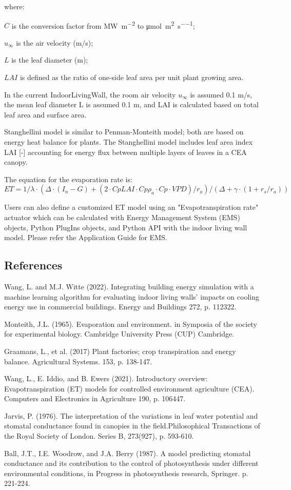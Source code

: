 where:

\(C\) is the conversion factor from \unit{\mega\watt\per\square\meter} to \unit{\micro\mole\per\square\meter\per\second};

\(u_\infty\) is the air velocity (m/s);

\(L\) is the leaf diameter (m);

\(LAI\) is defined as the ratio of one-side leaf area per unit plant growing area. 

In the current IndoorLivingWall, the room air velocity \(u_\infty\) is assumed 0.1 m/s, the mean leaf diameter L is assumed 0.1 m, and LAI is calculated based on total leaf area and surface area. 

Stanghellini model is similar to Penman-Monteith model; both are based on energy heat balance for plants. The Stanghellini model includes leaf area index LAI [-] accounting for energy flux between multiple layers of leaves in a CEA canopy. 

The equation for the evaporation rate is:
\begin{equation}
ET=1/\lambda \cdot (\Delta \cdot(I_n-G)+(2 \cdot Cp LAI \cdot Cp \rho_a \cdot Cp \cdot VPD)/r_a )/(\Delta+\gamma \cdot (1+r_s/r_a ) )
\end{equation}

Users can also define a customized ET model using an "Evapotranspiration rate" actuator which can be calculated with Energy Management System (EMS) objects, Python PlugIns objects, and Python API with the indoor living wall model. Please refer the Application Guide for EMS.

\subsection{References}\label{references-indoorlivingwall}

Wang, L. and M.J. Witte (2022). Integrating building energy simulation with a machine learning algorithm for evaluating indoor living walls’ impacts on cooling energy use in commercial buildings. Energy and Buildings 272, p. 112322.

  Monteith, J.L. (1965). Evaporation and environment. in Symposia of the society for experimental biology. Cambridge University Press (CUP) Cambridge.
  
  Graamans, L., et al. (2017) Plant factories; crop transpiration and energy balance. Agricultural Systems. 153, p. 138-147.
  
  Wang, L., E. Iddio, and B. Ewers (2021). Introductory overview: Evapotranspiration (ET) models for controlled environment agriculture (CEA). Computers and Electronics in Agriculture 190, p. 106447.
  
  Jarvis, P. (1976). The interpretation of the variations in leaf water potential and stomatal conductance found in canopies in the field.Philosophical Transactions of the Royal Society of London. Series B, 273(927), p. 593-610.
  
  Ball, J.T., I.E. Woodrow, and J.A. Berry (1987). A model predicting stomatal conductance and its contribution to the control of photosynthesis under different environmental conditions, in Progress in photosynthesis research, Springer. p. 221-224.

